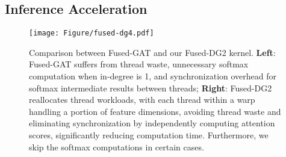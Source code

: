 \subsection{Inference Acceleration}
\label{sec:Inference_Acceleration}
\begin{figure}[!h]
    \centering
    \texttt{[image: Figure/fused-dg4.pdf]}
    \vspace{-35pt}
    \caption{Comparison between Fused-GAT and our Fused-DG2 kernel. \textbf{Left}: Fused-GAT suffers from thread waste, unnecessary softmax computation when in-degree is 1, and synchronization overhead for softmax intermediate results  between threads; \textbf{Right}: Fused-DG2 reallocates thread workloads, with each thread within a warp handling a portion of feature dimensions, avoiding thread waste and eliminating synchronization by independently computing attention scores, significantly reducing computation time. Furthermore, we skip the softmax computations in certain cases.}
    \vspace{-15pt}
\end{figure}

